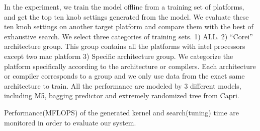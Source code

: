 In the experiment, we train the model offline from a training set of platforms, and get the top ten knob settings generated from the model.
We evaluate these ten knob settings on another target platform and compare them with the best of exhaustive search. We select
three categories of training sets. 1) ALL. 2) ``Corei'' architecture group. This group contains all the platforms
with intel processors except two mac platform 3) Specific architecture group.
We categorize the platform specifically according to the architecture or compilers. Each architecture or compiler corresponds to a group and we only use data from the exact same architecture to train. All the performance are modeled by 3 different models, including M5, bagging predictor and extremely randomized tree from Capri.

Performance(MFLOPS) of the generated kernel and search(tuning) time are monitored in order to evaluate our system.
